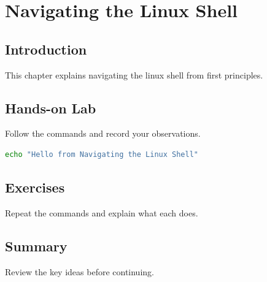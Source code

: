 \chapter{Navigating the Linux Shell}
\label{vol2chap2}



\section{Introduction}
This chapter explains navigating the linux shell from first principles.

\section{Hands-on Lab}
Follow the commands and record your observations.

\begin{lstlisting}[language=bash]
echo "Hello from Navigating the Linux Shell"
\end{lstlisting}

\section{Exercises}
\begin{exercise}
Repeat the commands and explain what each does.
\end{exercise}

\section{Summary}
Review the key ideas before continuing.
